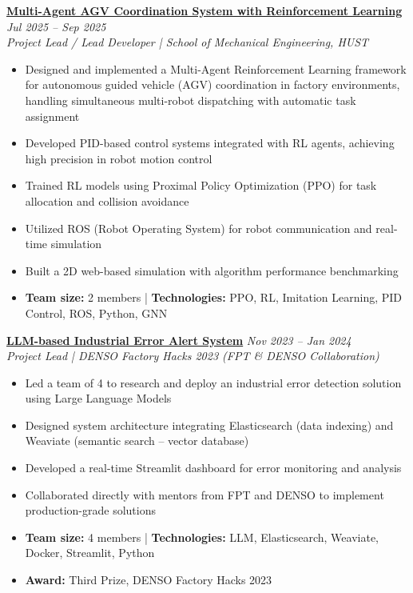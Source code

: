 \documentclass[11pt,a4paper]{article}
\newcommand{\cventry}[4]{
  \noindent\textbf{#1} \hfill \textit{#2} \\
  \textit{#3} \\
  #4
  \vspace{0.4em}
}
\begin{document}
\cventry
  {\href{https://andrewhaward2310.github.io/gnn-il-ppo-paper/}{Multi-Agent AGV Coordination System with Reinforcement Learning}}
  {Jul 2025 -- Sep 2025}
  {Project Lead / Lead Developer | School of Mechanical Engineering, HUST}
  {
    \begin{itemize}[leftmargin=1.5em, topsep=0pt, itemsep=0.15em]
      \item Designed and implemented a Multi-Agent Reinforcement Learning framework for autonomous guided vehicle (AGV) coordination in factory environments, handling simultaneous multi-robot dispatching with automatic task assignment
      \item Developed PID-based control systems integrated with RL agents, achieving high precision in robot motion control
      \item Trained RL models using Proximal Policy Optimization (PPO) for task allocation and collision avoidance
      \item Utilized ROS (Robot Operating System) for robot communication and real-time simulation
      \item Built a 2D web-based simulation with algorithm performance benchmarking
      \item \textbf{Team size:} 2 members \quad | \quad \textbf{Technologies:} PPO, RL, Imitation Learning, PID Control, ROS, Python, GNN
    \end{itemize}
  }

\cventry
  {\href{https://vjst.vn/cuoc-thi-hackathon-cua-denso-va-fpt-software-co-giai-thuong-200-trieu-dong-59481.html?fbclid=IwY2xjawQTdZ9leHRuA2FlbQIxMABicmlkETFDWmpMMnZNRjF3Nlh1VWVLc3J0YwZhcHBfaWQQMjIyMDM5MTc4ODIwMDg5MgABHiY3rVz4BPDp9Aom3Gv6v9pxeaGsxfrj0OlFoTVcmg4CX-xRBPAkNeMoXjze_aem__mBXkomTfZ92Jzh9eUT30w}
  {LLM-based Industrial Error Alert System}}
  {Nov 2023 -- Jan 2024}
  {Project Lead | DENSO Factory Hacks 2023 (FPT \& DENSO Collaboration)}
  {
    \begin{itemize}[leftmargin=1.5em, topsep=0pt, itemsep=0.15em]
      \item Led a team of 4 to research and deploy an industrial error detection solution using Large Language Models
      \item Designed system architecture integrating Elasticsearch (data indexing) and Weaviate (semantic search -- vector database)
      \item Developed a real-time Streamlit dashboard for error monitoring and analysis
      \item Collaborated directly with mentors from FPT and DENSO to implement production-grade solutions
      \item \textbf{Team size:} 4 members \quad | \quad \textbf{Technologies:} LLM, Elasticsearch, Weaviate, Docker, Streamlit, Python
      \item \textbf{Award:} Third Prize, DENSO Factory Hacks 2023
    \end{itemize}
  }
\end{document}
